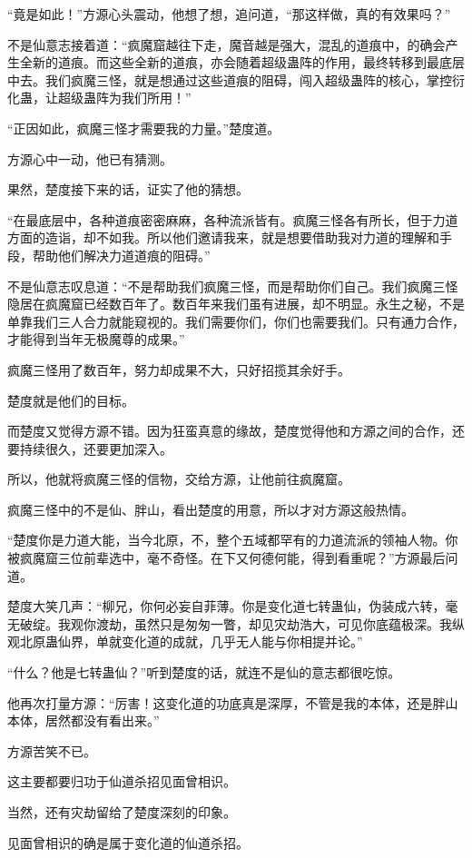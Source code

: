\begin{this_body}
“竟是如此！”方源心头震动，他想了想，追问道，“那这样做，真的有效果吗？”

不是仙意志接着道：“疯魔窟越往下走，魔音越是强大，混乱的道痕中，的确会产生全新的道痕。而这些全新的道痕，亦会随着超级蛊阵的作用，最终转移到最底层中去。我们疯魔三怪，就是想通过这些道痕的阻碍，闯入超级蛊阵的核心，掌控衍化蛊，让超级蛊阵为我们所用！”

“正因如此，疯魔三怪才需要我的力量。”楚度道。

方源心中一动，他已有猜测。

果然，楚度接下来的话，证实了他的猜想。

“在最底层中，各种道痕密密麻麻，各种流派皆有。疯魔三怪各有所长，但于力道方面的造诣，却不如我。所以他们邀请我来，就是想要借助我对力道的理解和手段，帮助他们解决力道道痕的阻碍。”

不是仙意志叹息道：“不是帮助我们疯魔三怪，而是帮助你们自己。我们疯魔三怪隐居在疯魔窟已经数百年了。数百年来我们虽有进展，却不明显。永生之秘，不是单靠我们三人合力就能窥视的。我们需要你们，你们也需要我们。只有通力合作，才能得到当年无极魔尊的成果。”

疯魔三怪用了数百年，努力却成果不大，只好招揽其余好手。

楚度就是他们的目标。

而楚度又觉得方源不错。因为狂蛮真意的缘故，楚度觉得他和方源之间的合作，还要持续很久，还要更加深入。

所以，他就将疯魔三怪的信物，交给方源，让他前往疯魔窟。

疯魔三怪中的不是仙、胖山，看出楚度的用意，所以才对方源这般热情。

“楚度你是力道大能，当今北原，不，整个五域都罕有的力道流派的领袖人物。你被疯魔窟三位前辈选中，毫不奇怪。在下又何德何能，得到看重呢？”方源最后问道。

楚度大笑几声：“柳兄，你何必妄自菲薄。你是变化道七转蛊仙，伪装成六转，毫无破绽。我观你渡劫，虽然只是匆匆一瞥，却见灾劫浩大，可见你底蕴极深。我纵观北原蛊仙界，单就变化道的成就，几乎无人能与你相提并论。”

“什么？他是七转蛊仙？”听到楚度的话，就连不是仙的意志都很吃惊。

他再次打量方源：“厉害！这变化道的功底真是深厚，不管是我的本体，还是胖山本体，居然都没有看出来。”

方源苦笑不已。

这主要都要归功于仙道杀招见面曾相识。

当然，还有灾劫留给了楚度深刻的印象。

见面曾相识的确是属于变化道的仙道杀招。


\end{this_body}

